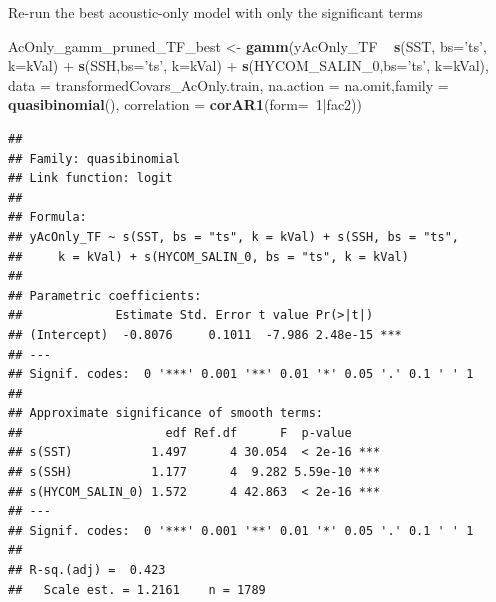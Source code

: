 \documentclass[11pt,]{article}
\newenvironment{Shaded}{\begin{snugshade}}{\end{snugshade}}
\newcommand{\KeywordTok}[1]{\textcolor[rgb]{0.13,0.29,0.53}{\textbf{{#1}}}}
\newcommand{\DataTypeTok}[1]{\textcolor[rgb]{0.13,0.29,0.53}{{#1}}}
\newcommand{\DecValTok}[1]{\textcolor[rgb]{0.00,0.00,0.81}{{#1}}}
\newcommand{\StringTok}[1]{\textcolor[rgb]{0.31,0.60,0.02}{{#1}}}
\newcommand{\NormalTok}[1]{{#1}}
\begin{document}
Re-run the best acoustic-only model with only the significant terms

\begin{Shaded}
\begin{Highlighting}[]
\NormalTok{AcOnly_gamm_pruned_TF_best <-}\StringTok{ }\KeywordTok{gamm}\NormalTok{(yAcOnly_TF ~}\StringTok{ }\KeywordTok{s}\NormalTok{(SST, }\DataTypeTok{bs=}\StringTok{'ts'}\NormalTok{, }\DataTypeTok{k=}\NormalTok{kVal)}
                                      \NormalTok{+}\StringTok{ }\KeywordTok{s}\NormalTok{(SSH,}\DataTypeTok{bs=}\StringTok{'ts'}\NormalTok{, }\DataTypeTok{k=}\NormalTok{kVal)}
                                      \NormalTok{+}\StringTok{ }\KeywordTok{s}\NormalTok{(HYCOM_SALIN_0,}\DataTypeTok{bs=}\StringTok{'ts'}\NormalTok{, }\DataTypeTok{k=}\NormalTok{kVal),}
                                      \DataTypeTok{data =} \NormalTok{transformedCovars_AcOnly.train,}
                                      \DataTypeTok{na.action =} \NormalTok{na.omit,}\DataTypeTok{family =} \KeywordTok{quasibinomial}\NormalTok{(),}
                                      \DataTypeTok{correlation =} \KeywordTok{corAR1}\NormalTok{(}\DataTypeTok{form=}\NormalTok{~}\DecValTok{1}\NormalTok{|fac2)) }
\end{Highlighting}
\end{Shaded}

\begin{Shaded}
\end{Shaded}

\begin{verbatim}
## 
## Family: quasibinomial 
## Link function: logit 
## 
## Formula:
## yAcOnly_TF ~ s(SST, bs = "ts", k = kVal) + s(SSH, bs = "ts", 
##     k = kVal) + s(HYCOM_SALIN_0, bs = "ts", k = kVal)
## 
## Parametric coefficients:
##             Estimate Std. Error t value Pr(>|t|)    
## (Intercept)  -0.8076     0.1011  -7.986 2.48e-15 ***
## ---
## Signif. codes:  0 '***' 0.001 '**' 0.01 '*' 0.05 '.' 0.1 ' ' 1
## 
## Approximate significance of smooth terms:
##                    edf Ref.df      F  p-value    
## s(SST)           1.497      4 30.054  < 2e-16 ***
## s(SSH)           1.177      4  9.282 5.59e-10 ***
## s(HYCOM_SALIN_0) 1.572      4 42.863  < 2e-16 ***
## ---
## Signif. codes:  0 '***' 0.001 '**' 0.01 '*' 0.05 '.' 0.1 ' ' 1
## 
## R-sq.(adj) =  0.423   
##   Scale est. = 1.2161    n = 1789
\end{verbatim}
\end{document}
